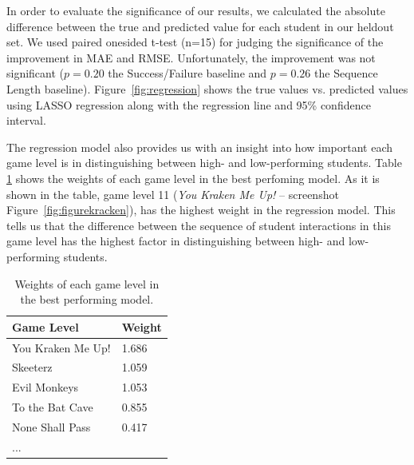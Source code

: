 \documentclass{sigchi}
\begin{document}
In order to evaluate the significance of our results, we calculated the absolute difference between the true and predicted value for each student in our heldout set.
We used paired onesided t-test (n=15) for judging the significance of the improvement in MAE and RMSE.
Unfortunately, the improvement was not significant ($p=0.20$ the Success/Failure baseline and $p=0.26$ the Sequence Length baseline). Figure~\ref{fig:regression} shows the true values vs. predicted values using LASSO regression along with the regression line and 95\% confidence interval.

The regression model also provides us with an insight into how important each game level is in distinguishing between high- and low-performing students. Table \ref{tab:regrweights} shows the weights of each game level in the best perfoming model.
As it is shown in the table, game level 11 (\textit{You Kraken Me Up!} -- screenshot Figure~\ref{fig:figurekracken}), has the highest weight in the regression model. 
This tells us that the difference between the sequence of student interactions in this game level has the highest factor in distinguishing between high- and low-performing students.

\begin{table}[b]
	\centering
	\begin{tabular}{ll}
		\hline
		\textbf{Game Level} & \textbf{Weight} \\ \hline
		You Kraken Me Up!   & 1.686                               \\
		Skeeterz            & 1.059                               \\
		Evil Monkeys        & 1.053                               \\
		To the Bat Cave     & 0.855                               \\
		None Shall Pass     & 0.417                               \\
		...                 &                                    
	\end{tabular}
	\caption{Weights of each game level in the best performing model.}
	\label{tab:regrweights}	
\end{table}
\end{document}
